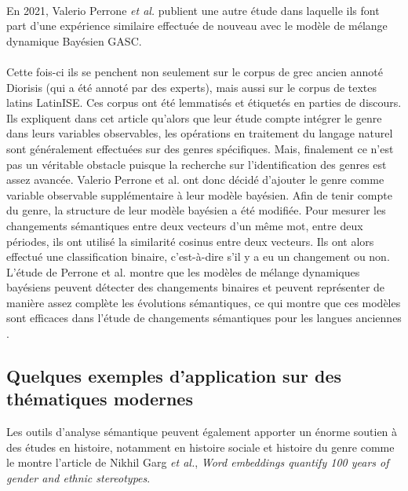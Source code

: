 \documentclass{article}
\begin{document}
\paragraph{}
En 2021, Valerio Perrone \textit{et al.} publient une autre étude \cite{perrone2021lexical} dans laquelle ils font part d’une expérience similaire effectuée de nouveau avec le modèle de mélange dynamique Bayésien GASC. 
\paragraph{}
Cette fois-ci ils se penchent non seulement sur le corpus de grec ancien annoté Diorisis (qui a été annoté par des experts), mais aussi sur le corpus de textes latins LatinISE. Ces corpus ont été lemmatisés et étiquetés en parties de discours. Ils expliquent dans cet article qu’alors que leur étude compte intégrer le genre dans leurs variables observables, les opérations en traitement du langage naturel sont généralement effectuées sur des genres spécifiques. Mais, finalement ce n’est pas un véritable obstacle puisque la recherche sur l’identification des genres est assez avancée. Valerio Perrone et al. ont donc décidé d’ajouter le genre comme variable observable supplémentaire à leur modèle bayésien. Afin de tenir compte du genre, la structure de leur modèle bayésien a été modifiée. Pour mesurer les changements sémantiques entre deux vecteurs d’un même mot, entre deux périodes, ils ont utilisé la similarité cosinus entre deux vecteurs. Ils ont alors effectué une classification binaire, c’est-à-dire s’il y a eu un changement ou non. L’étude de Perrone et al. montre que les modèles de mélange dynamiques bayésiens peuvent détecter des changements binaires et peuvent représenter de manière assez complète les évolutions sémantiques, ce qui montre que ces modèles sont efficaces dans l’étude de changements sémantiques pour les langues anciennes \cite{perrone2021lexical}.

\subsection{Quelques exemples d'application sur des thématiques modernes}
Les outils d’analyse sémantique peuvent également apporter un énorme soutien à des études en histoire, notamment en histoire sociale et histoire du genre comme le montre l’article de Nikhil Garg \textit{et al.}, \textit{Word embeddings quantify 100 years of gender and ethnic stereotypes}. 
\end{document}
